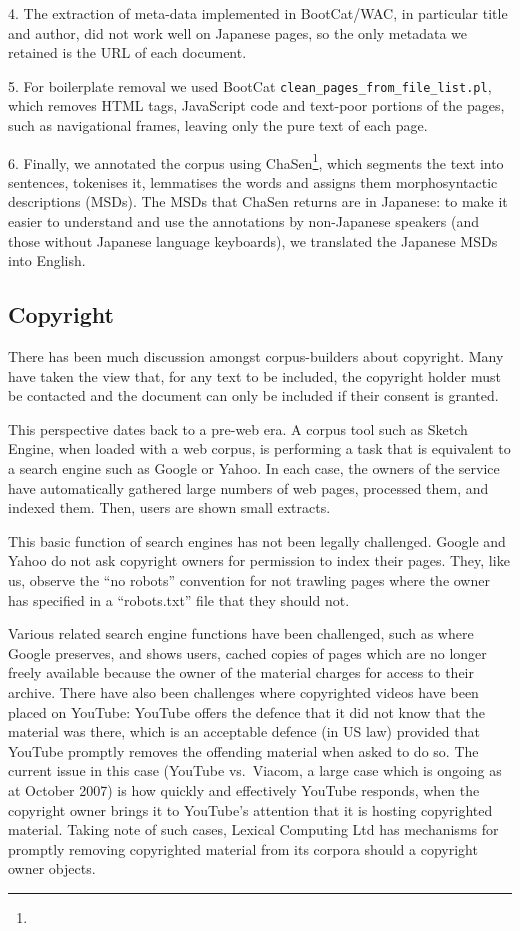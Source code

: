 \documentclass[english]{jnlp_1.4}
\newcommand{\url}[1]{}
\begin{document}
4. The extraction of meta-data implemented in BootCat/WAC, in particular title and author, did not work well on Japanese pages, so the only metadata we retained is the URL of each document.

5. For boilerplate removal we used BootCat {\tt clean\_pages\_from\_file\_list.pl}, which removes HTML tags, JavaScript code and text-poor portions of the pages, such as navigational frames, leaving only the pure text of each page. 

6. Finally, we annotated the corpus using
ChaSen\footnote{
	\url{http://chasen.naist.jp/}
}, which segments the
text into sentences, tokenises it, lemmatises the words and assigns
them morphosyntactic descriptions (MSDs). The MSDs that ChaSen returns
are in Japanese: to make it easier to understand and use the
annotations by non-Japanese speakers (and those without Japanese
language keyboards), we translated the Japanese MSDs into English.


\subsection{Copyright}

There has been much discussion amongst corpus-builders about copyright. Many have taken the view that, for any text to be included, the copyright holder must be contacted and the document can only be included if their consent is granted.

This perspective dates back to a pre-web era. A corpus tool such as Sketch Engine, when loaded with a web corpus, is performing a task that is equivalent to a search engine such as Google or Yahoo. In each case, the owners of the service have automatically gathered large numbers of web pages, processed them, and indexed them. Then, users are shown small extracts. 

This basic function of search engines has not been legally challenged. Google and Yahoo do not ask copyright owners for permission to index their pages. They, like us, observe the ``no robots'' convention for not trawling pages where the owner has specified in a ``robots.txt'' file that they should not. 

Various related search engine functions have been challenged, such as where Google preserves, and shows users, cached copies of pages which are no longer freely available because the owner of the material charges for access to their archive. There have also been challenges where copyrighted videos have been placed on YouTube: YouTube offers the defence that it did not know that the material was there, which is an acceptable defence (in US law) provided that YouTube promptly removes the offending material when asked to do so.  The current issue in this case (YouTube vs.\ Viacom, a large case which is ongoing as at October 2007) is how quickly and effectively YouTube responds, when the copyright owner brings it to YouTube's attention that it is hosting copyrighted material. Taking note of such cases, Lexical Computing Ltd has mechanisms for promptly removing copyrighted material from its corpora should a copyright owner objects.
\end{document}
